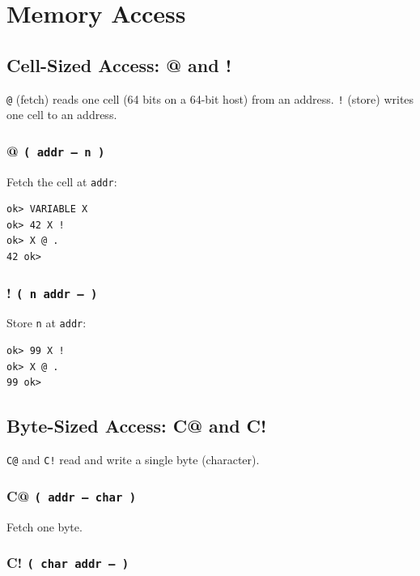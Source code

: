 \chapter{Memory Access}
\label{chap:memory}

\section{Cell-Sized Access: @ and !}
\label{sec:at-store}

\texttt{@} (fetch) reads one cell (64 bits on a 64-bit host) from an address.
\texttt{!} (store) writes one cell to an address.

\subsection*{@ \texttt{( addr -- n )}}

Fetch the cell at \texttt{addr}:

\begin{lstlisting}[language=Forth]
ok> VARIABLE X
ok> 42 X !
ok> X @ .
42 ok>
\end{lstlisting}

\subsection*{! \texttt{( n addr -- )}}

Store \texttt{n} at \texttt{addr}:

\begin{lstlisting}[language=Forth]
ok> 99 X !
ok> X @ .
99 ok>
\end{lstlisting}

\section{Byte-Sized Access: C@ and C!}
\label{sec:cat-cstore}

\texttt{C@} and \texttt{C!} read and write a single byte (character).

\subsection*{C@ \texttt{( addr -- char )}}

Fetch one byte.

\subsection*{C! \texttt{( char addr -- )}}

